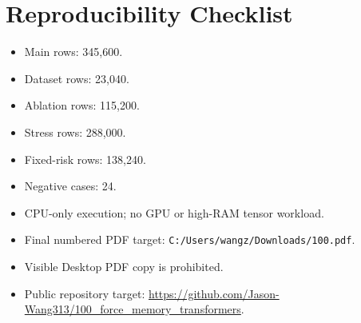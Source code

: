 \documentclass{article}
\begin{document}
\section{Reproducibility Checklist}
\begin{itemize}
\item Main rows: 345,600.
\item Dataset rows: 23,040.
\item Ablation rows: 115,200.
\item Stress rows: 288,000.
\item Fixed-risk rows: 138,240.
\item Negative cases: 24.
\item CPU-only execution; no GPU or high-RAM tensor workload.
\item Final numbered PDF target: \texttt{C:/Users/wangz/Downloads/100.pdf}.
\item Visible Desktop PDF copy is prohibited.
\item Public repository target: \url{https://github.com/Jason-Wang313/100_force_memory_transformers}.
\end{itemize}



\end{document}

